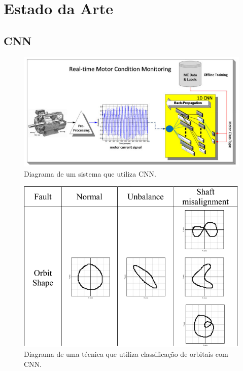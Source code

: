 % 

\section{Estado da Arte}


% 

\subsection{CNN}

\begin{figure}[H]
    \caption{Diagrama de um sistema que utiliza CNN.}
    \begin{center}
        \includegraphics[scale=.45]{referencial/img/cnn_ince_p2.png}
    \end{center}
    \label{fig:}
\end{figure}


\begin{figure}[H]
    \caption{Diagrama de uma técnica que utiliza classificação de orbitais com CNN.}
    \begin{center}
        \includegraphics[scale=.45]{referencial/img/orbit_jeong_p3.png}
    \end{center}
    \label{fig:}
\end{figure}

